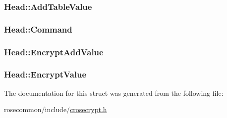 \subsubsection[{\texorpdfstring{Add\+Table\+Value}{AddTableValue}}]{ Head\+::\+Add\+Table\+Value}\hypertarget{structHead_a85ba2e132b3ba4efbdd50b8a1518bfe8}{}\label{structHead_a85ba2e132b3ba4efbdd50b8a1518bfe8}
\subsubsection[{\texorpdfstring{Command}{Command}}]{ Head\+::\+Command}\hypertarget{structHead_a31dd16236489258d0f5a93613c93e141}{}\label{structHead_a31dd16236489258d0f5a93613c93e141}
\subsubsection[{\texorpdfstring{Encrypt\+Add\+Value}{EncryptAddValue}}]{ Head\+::\+Encrypt\+Add\+Value}\hypertarget{structHead_a49e43eb40933ec9678070542af6957e2}{}\label{structHead_a49e43eb40933ec9678070542af6957e2}
\subsubsection[{\texorpdfstring{Encrypt\+Value}{EncryptValue}}]{ Head\+::\+Encrypt\+Value}\hypertarget{structHead_a3e27ec06adee3efd9d152e9283a69a49}{}\label{structHead_a3e27ec06adee3efd9d152e9283a69a49}


The documentation for this struct was generated from the following file\+:\begin{DoxyCompactItemize}
\item 
rosecommon/include/\hyperlink{crosecrypt_8h}{crosecrypt.\+h}\end{DoxyCompactItemize}
